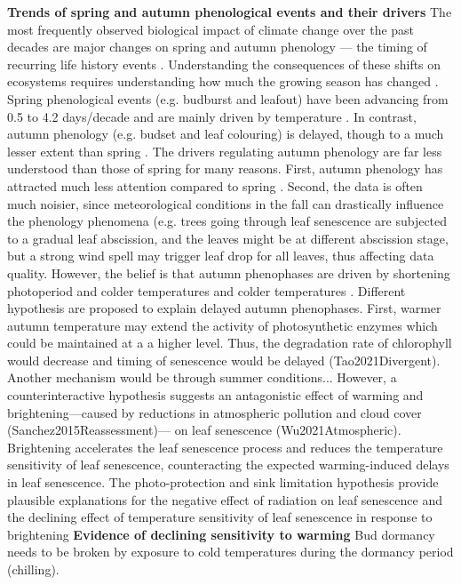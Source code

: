 \documentclass{article}
\begin{document}
\textbf{Trends of spring and autumn phenological events and their drivers}
The most frequently observed biological impact of climate change over the past decades are major changes on spring and autumn phenology --- the timing of recurring life history events \cite{parmesan_globally_2003,cleland_shifting_2007,lieth_phenology_1974,woolway_phenological_2021,menzel_european_2006}. Understanding the consequences of these shifts on ecosystems requires understanding how much the growing season has changed \cite{duputie_phenological_2015}. Spring phenological events (e.g. budburst and leafout) have been advancing from 0.5 \cite{wolfe_climate_2005} to 4.2 days/decade \cite{chmielewski_response_2001,fu_recent_2014} and are mainly driven by temperature \cite{chuine_why_2010,cleland_shifting_2007,penuelas_responses_2001}. In contrast, autumn phenology (e.g. budset and leaf colouring) is delayed, though to a much lesser extent than spring \cite{gallinat_autumn_2015,jeong_macroscale_2014}. The drivers regulating autumn phenology are far less understood than those of spring for many reasons. First, autumn phenology has attracted much less attention compared to spring \cite{piao_plant_2019}. Second, the data is often much noisier, since meteorological conditions in the fall can drastically influence the phenology phenomena (e.g. trees going through leaf senescence are subjected to a gradual leaf abscission, and the leaves might be at different abscission stage, but a strong wind spell may trigger leaf drop for all leaves, thus affecting data quality. However, the belief is that autumn phenophases are driven by shortening photoperiod and colder temperatures \cite{cooke_dynamic_2012,flynn_temperature_2018,korner_phenology_2010} and colder temperatures \cite{cooke_dynamic_2012,delpierre_temperate_2016}. Different hypothesis are proposed to explain delayed autumn phenophases. First, warmer autumn temperature may extend the activity of photosynthetic enzymes which could be maintained at a a higher level. Thus, the degradation rate of chlorophyll would decrease and timing of senescence would be delayed (Tao2021Divergent). Another mechanism would be through summer conditions... However, a counterinteractive hypothesis suggests an 
antagonistic effect of warming and brightening---caused by reductions in atmospheric pollution and cloud  cover (Sanchez2015Reassessment)--- on leaf senescence (Wu2021Atmospheric). Brightening accelerates the leaf senescence process and reduces the temperature sensitivity of leaf senescence, counteracting the expected warming-induced delays in leaf senescence. The photo-protection and sink limitation hypothesis provide plausible explanations for the negative effect of radiation on leaf senescence and the declining effect of temperature sensitivity of leaf senescence in response to brightening
\textbf{Evidence of declining sensitivity to warming}
Bud dormancy needs to be broken by exposure to cold temperatures during the dormancy period (chilling).
\end{document}
